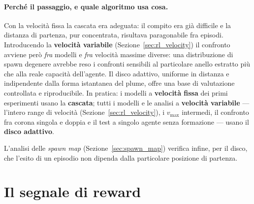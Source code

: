 \paragraph{Perch\'e il passaggio, e quale algoritmo usa cosa.}
Con la velocit\`a fissa la cascata era adeguata: il compito era gi\`a difficile e la distanza
di partenza, pur concentrata, risultava paragonabile fra episodi. Introducendo la
\textbf{velocit\`a variabile} (Sezione~\ref{sec:rl_velocity}) il confronto avviene per\`o
\emph{fra} modelli e \emph{fra} velocit\`a massime diverse: una distribuzione di spawn
degenere avrebbe reso i confronti sensibili al particolare anello estratto pi\`u che alla
reale capacit\`a dell'agente. Il disco adattivo, uniforme in distanza e indipendente dalla
forma istantanea del plume, offre una base di valutazione controllata e riproducibile. In
pratica: i modelli a \textbf{velocit\`a fissa} dei primi esperimenti usano la
\textbf{cascata}; tutti i modelli e le analisi a \textbf{velocit\`a variabile} --- l'intero
range di velocit\`a (Sezione~\ref{sec:rl_velocity}), i $v_{\max}$ intermedi, il confronto fra
corona singola e doppia e il test a singolo agente senza formazione --- usano il
\textbf{disco adattivo}.

L'analisi delle \emph{spawn map} (Sezione~\ref{sec:spawn_map}) verifica infine, per il disco,
che l'esito di un episodio non dipenda dalla particolare posizione di partenza.

\section{Il segnale di reward}
\label{sec:reward}


